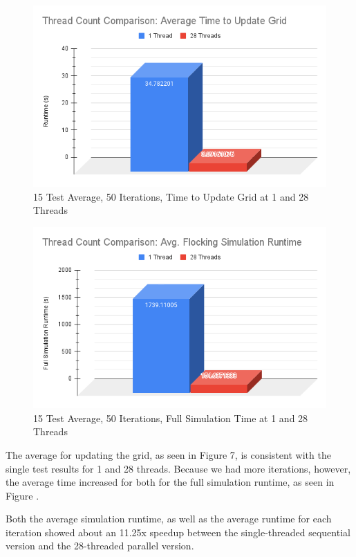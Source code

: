 \documentclass[12pt]{article}
\begin{document}
\begin{figure}[htbp]
\centering
\includegraphics[width=0.8\linewidth]{FlockingGridUpdate2.png}
\caption{\label{fig:flock_3}15 Test Average, 50 Iterations, Time to Update Grid at 1 and 28 Threads}
\end{figure}
\begin{figure}[htbp]
\centering
\includegraphics[width=0.8\linewidth]{FlockingSimulation2.png}
\caption{\label{fig:flock_4}15 Test Average, 50 Iterations, Full Simulation Time at 1 and 28 Threads}
\end{figure}
\par The average for updating the grid, as seen in Figure 7, is consistent with the single test results for 1 and 28 threads. Because we had more iterations, however, the average time increased for both for the full simulation runtime, as seen in Figure .

\par Both the average simulation runtime, as well as the average runtime for each iteration showed about an 11.25x speedup between the single-threaded sequential version and the 28-threaded parallel version.
\end{document}

